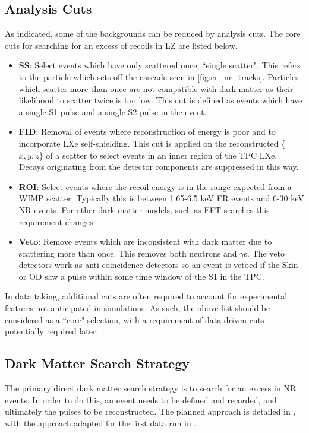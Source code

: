 \subsection{Analysis Cuts}
\label{sec:lz_analysis_cuts}
\par
As indicated, some of the backgrounds can be reduced by analysis cuts. 
The core cuts for searching for an excess of recoils in LZ are listed below.
\begin{itemize}
    \item \textbf{SS}: Select events which have only scattered once, ``single scatter". This refers to the particle which sets off the cascade seen in \autoref{fig:er_nr_tracks}. Particles which scatter more than once are not compatible with dark matter as their likelihood to scatter twice is too low. This cut is defined as events which have a single S1 pulse and a single S2 pulse in the event.
    \item \textbf{FID}: Removal of events where reconstruction of energy is poor and to incorporate LXe self-shielding. This cut is applied on the reconstructed \{$x,y,z$\} of a scatter to select events in an inner region of the TPC LXe. Decays originating from the detector components are suppressed in this way.
    \item \textbf{ROI}: Select events where the recoil energy is in the range expected from a WIMP scatter. Typically this is between 1.65-6.5 keV ER events and 6-30 keV NR events. For other dark matter models, such as EFT searches this requirement changes.%
    \item \textbf{Veto}: Remove events which are inconsistent with dark matter due to scattering more than once. This removes both neutrons and $\gamma$s. The veto detectors work as anti-coincidence detectors so an event is vetoed if the Skin or OD saw a pulse within some time window of the S1 in the TPC.
\end{itemize}
In data taking, additional cuts are often required to account for experimental features not anticipated in simulations.
As such, the above list should be considered as a ``core" selection, with a requirement of data-driven cuts potentially required later.

\subsection{Dark Matter Search Strategy}
\par
The primary direct dark matter search strategy is to search for an excess in NR events.
In order to do this, an event needs to be defined and recorded, and ultimately the pulses to be reconstructed.
The planned approach is detailed in \cite{LZ_TechnicalDesignReview_ref}, with the approach adapted for the first data run in \cite{lz_ws_sr1_ref}.

